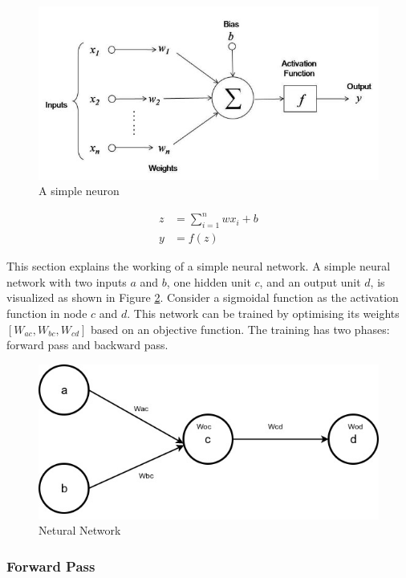 \documentclass[12pt]{report} %
\begin{document}
\begin{figure}[!tbp]
	\centering
	\caption{A simple neuron}
	\label{neuron}
	\includegraphics[scale=0.50]{image/neuron.jpg}
\end{figure}

\begin{align}
z & = \sum_{i=1}^{n} wx_i + b \\
y & = f(z)
\end{align}


This section explains the working of a simple neural network. A simple neural network with two inputs $a$ and $b$, one hidden unit $c$, and an output unit $d$, is visualized as shown in Figure \ref{net}. Consider a sigmoidal function as the activation function in node $c$ and $d$. This network can be trained by optimising its weights $[W_{ac}, W_{bc}, W_{cd}]$ based on an objective function. The training has two phases: forward pass and backward pass.



\begin{figure}[h]
	\centering
	\caption{Netural Network}
	\label{net}
	\includegraphics[scale=0.44]{image/Trace_Back_Prop.jpg}
\end{figure} 



\subsubsection*{Forward Pass}
\end{document}
